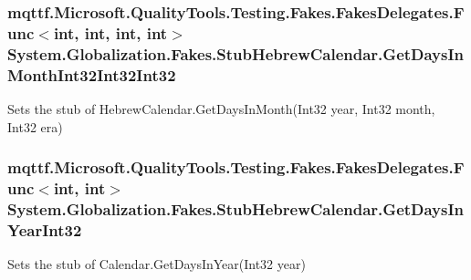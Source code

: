\hypertarget{class_system_1_1_globalization_1_1_fakes_1_1_stub_hebrew_calendar_a576114ba8527a2d9da38cedb0acb90a0}{
\subsubsection[{Get\-Days\-In\-Month\-Int32\-Int32\-Int32}]{\setlength{\rightskip}{0pt plus 5cm}mqttf.\-Microsoft.\-Quality\-Tools.\-Testing.\-Fakes.\-Fakes\-Delegates.\-Func$<$int, int, int, int$>$ System.\-Globalization.\-Fakes.\-Stub\-Hebrew\-Calendar.\-Get\-Days\-In\-Month\-Int32\-Int32\-Int32}}\label{class_system_1_1_globalization_1_1_fakes_1_1_stub_hebrew_calendar_a576114ba8527a2d9da38cedb0acb90a0}


Sets the stub of Hebrew\-Calendar.\-Get\-Days\-In\-Month(\-Int32 year, Int32 month, Int32 era)

\hypertarget{class_system_1_1_globalization_1_1_fakes_1_1_stub_hebrew_calendar_a84c011727fdd4f9a8a18003640c65169}{
\subsubsection[{Get\-Days\-In\-Year\-Int32}]{\setlength{\rightskip}{0pt plus 5cm}mqttf.\-Microsoft.\-Quality\-Tools.\-Testing.\-Fakes.\-Fakes\-Delegates.\-Func$<$int, int$>$ System.\-Globalization.\-Fakes.\-Stub\-Hebrew\-Calendar.\-Get\-Days\-In\-Year\-Int32}}\label{class_system_1_1_globalization_1_1_fakes_1_1_stub_hebrew_calendar_a84c011727fdd4f9a8a18003640c65169}


Sets the stub of Calendar.\-Get\-Days\-In\-Year(\-Int32 year)

